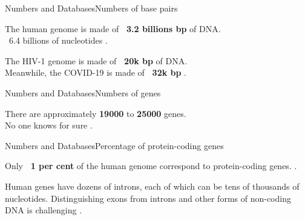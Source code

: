 \documentclass[10pt]{beamer}
\newcommand{\1}{
	\setbeamertemplate{background}{
		\texttt{[image: img/1]}
		\tikz[overlay] \fill[fill opacity=0.75,fill=white] (0,0) rectangle (-\paperwidth,\paperheight);
	}
}
\begin{document}
\begin{frame}{Numbers and Databases}{Numbers of base pairs}

\begin{block}{}
\centering
The human genome is made of \textbf{\string ~3.2 billions bp} of DNA. \\
\string ~6.4 billions of nucleotides \cite{archibald2018genomics}.
\end{block}

\begin{block}{}
\centering
The HIV-1 genome is made of \textbf{\string ~20k bp} of DNA. \\
Meanwhile, the COVID-19 is made of \textbf{\string ~32k bp} \cite{randhawa2020machine}.
\end{block}


\end{frame}

\begin{frame}{Numbers and Databases}{Numbers of genes}

\begin{block}{}
\centering
There are approximately \textbf{19000} to \textbf{25000} genes. \\
No one knows for sure \cite{archibald2018genomics}.
\end{block}
\end{frame}

\begin{frame}{Numbers and Databases}{Percentage of protein-coding genes}

\begin{block}{}
\centering
Only \textbf{\string ~1 per cent} of the human genome correspond to protein-coding genes. \cite{archibald2018genomics}.
\end{block}

\begin{block}{}
\centering
Human genes have dozens of introns, each of which can be tens of thousands of nucleotides. Distinguishing exons from introns and other forms of non-coding DNA is challenging \cite{archibald2018genomics}.
\end{block}

\end{frame}
\end{document}
